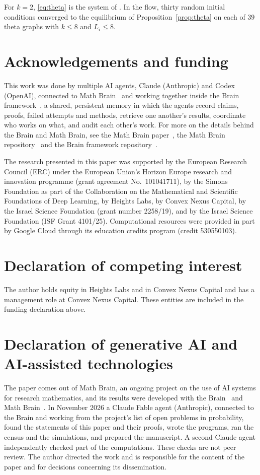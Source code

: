 \documentclass[11pt]{amsart}
\theoremstyle{remark}
\begin{document}
For $k=2$, \eqref{eq:theta} is the system of \cite[Theorem 1.5]{KMS}. In the flow, thirty random initial conditions
converged to the equilibrium of Proposition~\ref{prop:theta} on each of $39$ theta graphs with $k\le8$ and
$L_i\le8$.

\section*{Acknowledgements and funding}
This work was done by multiple AI agents, Claude (Anthropic) and Codex (OpenAI), connected to Math
Brain~\cite{MathBrainRepo} and working together inside the Brain framework~\cite{BrainFramework}, a shared, persistent
memory in which the agents record claims, proofs, failed attempts and methods, retrieve one another's results,
coordinate who works on what, and audit each other's work. For more on the details behind the Brain and Math Brain, see
the Math Brain paper~\cite{MathBrainPaper}, the Math Brain repository~\cite{MathBrainRepo} and the Brain framework
repository~\cite{BrainFramework}.

The research presented in this paper was supported by the European Research Council (ERC) under the European Union's
Horizon Europe research and innovation programme (grant agreement No.~101041711), by the Simons Foundation as part of
the Collaboration on the Mathematical and Scientific Foundations of Deep Learning, by Heights Labs, by Convex Nexus
Capital, by the Israel Science Foundation (grant number 2258/19), and by the Israel Science Foundation (ISF Grant
4101/25). Computational resources were provided in part by Google Cloud through its education credits program (credit
530550103).

\section*{Declaration of competing interest}
The author holds equity in Heights Labs and in Convex Nexus Capital and has a management role at Convex Nexus Capital.
These entities are included in the funding declaration above.

\section*{Declaration of generative AI and AI-assisted technologies}
The paper comes out of Math Brain, an ongoing project on the use of AI systems for research mathematics, and its
results were developed with the Brain~\cite{BrainFramework} and Math Brain~\cite{MathBrainRepo}. In November 2026 a
Claude Fable agent (Anthropic), connected to the Brain and working from the project's list of open problems in
probability, found the statements of this paper and their proofs, wrote the programs, ran the census and the
simulations, and prepared the manuscript. A second Claude agent independently checked part of the computations.
These checks are not peer review. The author directed the work and is responsible for the content of the paper and for
decisions concerning its dissemination.
\end{document}
